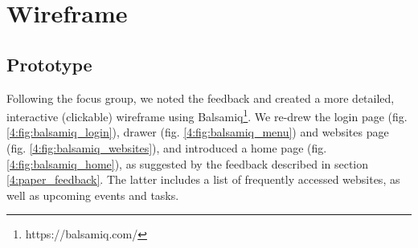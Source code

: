 \section{Wireframe} \label{4:wireframe}

\subsection{Prototype} \label{4:wireframe_prototype}

Following the focus group, we noted the feedback and created a more detailed, interactive (clickable) wireframe using Balsamiq\footnote{https://balsamiq.com/}. We re-drew the login page (fig. \ref{4:fig:balsamiq_login}), drawer (fig. \ref{4:fig:balsamiq_menu}) and websites page (fig. \ref{4:fig:balsamiq_websites}), and introduced a home page (fig. \ref{4:fig:balsamiq_home}), as suggested by the feedback described in section \ref{4:paper_feedback}. The latter includes a list of frequently accessed websites, as well as upcoming events and tasks.


